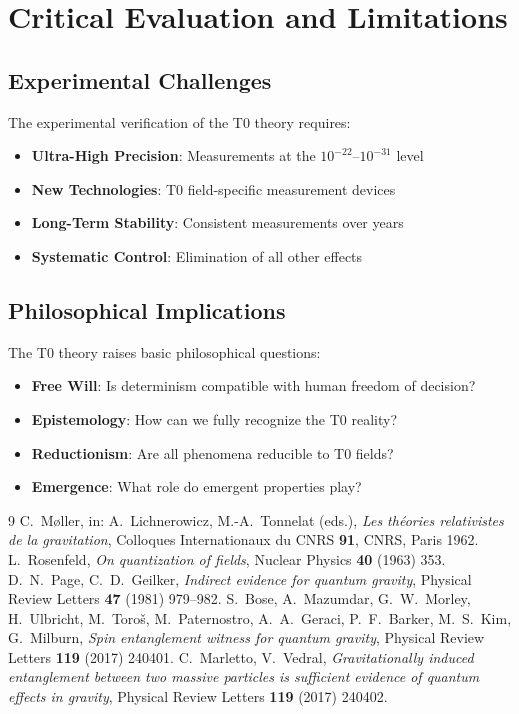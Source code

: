 	\section{Critical Evaluation and Limitations}
	\subsection{Experimental Challenges}
	The experimental verification of the T0 theory requires:
	\begin{itemize}
		\item \textbf{Ultra-High Precision}: Measurements at the $10^{-22}$--$10^{-31}$ level
		\item \textbf{New Technologies}: T0 field-specific measurement devices
		\item \textbf{Long-Term Stability}: Consistent measurements over years
		\item \textbf{Systematic Control}: Elimination of all other effects
	\end{itemize}
	\subsection{Philosophical Implications}
	The T0 theory raises basic philosophical questions:
	\begin{itemize}
		\item \textbf{Free Will}: Is determinism compatible with human freedom of decision?
		\item \textbf{Epistemology}: How can we fully recognize the T0 reality?
		\item \textbf{Reductionism}: Are all phenomena reducible to T0 fields?
		\item \textbf{Emergence}: What role do emergent properties play?
	\end{itemize}

	\begin{thebibliography}{9}
		 C.~M{\o}ller, in: A.~Lichnerowicz, M.-A.~Tonnelat (eds.), \textit{Les th\'eories relativistes de la gravitation}, Colloques Internationaux du CNRS \textbf{91}, CNRS, Paris 1962.
		 L.~Rosenfeld, \textit{On quantization of fields}, Nuclear Physics \textbf{40} (1963) 353.
		 D.~N.~Page, C.~D.~Geilker, \textit{Indirect evidence for quantum gravity}, Physical Review Letters \textbf{47} (1981) 979--982.
		 S.~Bose, A.~Mazumdar, G.~W.~Morley, H.~Ulbricht, M.~Toro\v{s}, M.~Paternostro, A.~A.~Geraci, P.~F.~Barker, M.~S.~Kim, G.~Milburn, \textit{Spin entanglement witness for quantum gravity}, Physical Review Letters \textbf{119} (2017) 240401.
		 C.~Marletto, V.~Vedral, \textit{Gravitationally induced entanglement between two massive particles is sufficient evidence of quantum effects in gravity}, Physical Review Letters \textbf{119} (2017) 240402.
	\end{thebibliography}
